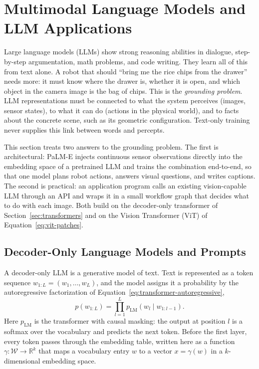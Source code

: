 \section{Multimodal Language Models and LLM Applications}
\label{sec:mllm}

Large language models (LLMs) show strong reasoning abilities in dialogue,
step-by-step argumentation, math problems, and code writing. They learn all of
this from text alone. A robot that should ``bring me the rice chips from the
drawer'' needs more: it must know where the drawer is, whether it is open, and
which object in the camera image is the bag of chips. This is the
\emph{grounding problem}. LLM representations must be connected to what the
system perceives (images, sensor states), to what it can do (actions in the
physical world), and to facts about the concrete scene, such as its geometric
configuration. Text-only training never supplies this link between words and
percepts.

This section treats two answers to the grounding problem. The first is
architectural: PaLM-E injects continuous sensor observations directly into the
embedding space of a pretrained LLM and trains the combination end-to-end, so
that one model plans robot actions, answers visual questions, and writes
captions. The second is practical: an application program calls an existing
vision-capable LLM through an API and wraps it in a small workflow graph that
decides what to do with each image. Both build on the decoder-only transformer
of Section~\ref{sec:transformers} and on the Vision Transformer (ViT) of
Equation~\ref{eq:vit-patches}.

\subsection{Decoder-Only Language Models and Prompts}

A decoder-only LLM is a generative model of text. Text is represented as a
token sequence $w_{1:L}=(w_1,\dots,w_L)$, and the model assigns it a
probability by the autoregressive factorization of
Equation~\ref{eq:transformer-autoregressive},
\begin{equation}
  p(w_{1:L}) = \prod_{l=1}^{L} p_{\mathrm{LM}}(w_l \mid w_{1:l-1}) .
  \label{eq:mllm-lm}
\end{equation}
\noindent
Here $p_{\mathrm{LM}}$ is the transformer with causal masking: the output at
position $l$ is a softmax over the vocabulary and predicts the next token.
Before the first layer, every token passes through the embedding table,
written here as a function $\gamma:\mathcal W\to\mathbb R^k$ that maps a
vocabulary entry $w$ to a vector $x=\gamma(w)$ in a $k$-dimensional
embedding space.

